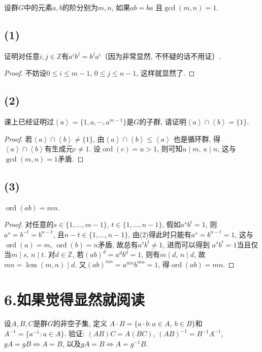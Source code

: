 \documentclass[12pt, a4paper, fontset=windows]{ctexart}
\newcommand{\Z}{\mathbb{Z}}
\newcommand{\gen}[1]{\left\langle{#1}\right\rangle}
\newcommand{\kh}[1]{（{#1}）} %
\newcommand{\lcm}{\operatorname{lcm}}
\newcommand{\ord}{\operatorname{ord}}
\begin{document}
设群$G$中的元素$a,b$的阶分别为$m,n$, 如果$ab=ba$
且$\gcd(m,n)=1$. 

\subsection*{(1)}

证明对任意$i,j\in\Z$有$a^ib^j=b^ja^i$\kh{因为非常显然, 不怀疑的话不用证}. 

\begin{proof}
不妨设$0\le i\le m-1$, $0\le j\le n-1$, 这样就显然了. 
\end{proof}

\subsection*{(2)}

课上已经证明过$\gen{a}=\{1,a,\cdots,a^{m-1}\}$是$G$的子群, 
请证明$\gen{a}\cap\gen{b}=\{1\}$. 

\begin{proof}
若$\gen{a}\cap\gen{b}\ne\{1\}$, 
由$\gen{a}\cap\gen{b}\le\gen{a}$
也是循环群, 得$\gen{a}\cap\gen{b}$有生成元$c\ne 1$. 
设$\ord(c)=u>1$, 则可知$u\mid m$, $u\mid n$, 这与$\gcd(m,n)=1$矛盾. 
\end{proof}

\subsection*{(3)}
\label{ord-mul}

$\ord(ab)=mn$. 

\begin{proof}
对任意的$s\in\{1,...,m-1\}$, $t\in\{1,...,n-1\}$, 假如$a^sb^t=1$, 
则$a^s=b^{-t}=b^{n-t}$, 且$n-t\in\{1,...,n-1\}$, 由(2)得此时只能有$a^s=b^{n-t}=1$, 
这与$\ord(a)=m$, $\ord(b)=n$矛盾, 故总有$a^sb^t\ne 1$, 进而可以得到
$a^sb^t=1$当且仅当$m\mid s$, $n\mid t$. 对$d\in\Z$, 若$(ab)^d=a^db^d=1$, 
则有$m\mid d$, $n\mid d$, 故$mn=\lcm(m,n)\mid d$. 又$(ab)^{mn}=a^{mn}b^{mn}=1$, 得$\ord(ab)=mn$. 
\end{proof}

\section*{6.\normalsize 如果觉得显然就阅读}

设$A,B,C$是群$G$的非空子集, 定义
$A\cdot B=\{a\cdot b:a\in A,\ b\in B\}$和
$A^{-1}=\{a^{-1}:a\in A\}$. 
验证: $(AB)C=A(BC)$, $(AB)^{-1}=B^{-1}A^{-1}$, 
$gA=gB\iff A=B$, 以及$gA=B\iff A=g^{-1}B$. 
\end{document}
